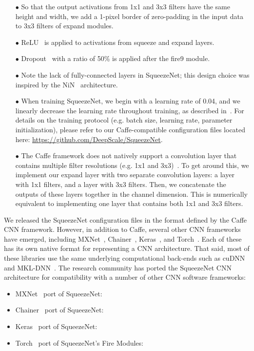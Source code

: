 \documentclass{article} \usepackage{iclr2017_conference,times}
\renewcommand{\cite}{\citep}
\begin{document}
\begin{itemize}
	\setlength\itemsep{0in} \item[$\bullet$]{So that the output activations from 1x1 and 3x3 filters have the same height and width, we add a 1-pixel border of zero-padding in the input data to 3x3 filters of expand modules.}
	\item[$\bullet$]{ReLU~\cite{ReLU} is applied to activations from squeeze and expand layers.}
	\item[$\bullet$]{Dropout~\cite{dropout} with a ratio of 50\% is applied after the fire9 module.}
	\item[$\bullet$]{Note the lack of fully-connected layers in SqueezeNet; this design choice was inspired by the NiN~\cite{NiN} architecture.}
\item[$\bullet$]{When training SqueezeNet, we begin with a learning rate of 0.04, and we linearly decrease the learning rate throughout training, as described in~\cite{linearLR}.
		For details on the training protocol (e.g. batch size, learning rate, parameter initialization), please refer to our Caffe-compatible configuration files located here: \href{https://github.com/DeepScale/SqueezeNet}{https://github.com/DeepScale/SqueezeNet}.}
	\item[$\bullet$]{The Caffe framework does not natively support a convolution layer that contains multiple filter resolutions (e.g. 1x1 and 3x3)~\cite{jia2014caffe}. To get around this, we implement our expand layer with two separate convolution layers: a layer with 1x1 filters, and a layer with 3x3 filters. Then, we concatenate the outputs of these layers together in the channel dimension. This is numerically equivalent to implementing one layer that contains both 1x1 and 3x3 filters.}
\end{itemize}

We released the SqueezeNet configuration files in the format defined by the Caffe CNN framework. 
However, in addition to Caffe, several other CNN frameworks have emerged, including MXNet~\cite{mxnet}, Chainer~\cite{chainer}, Keras~\cite{keras}, and Torch~\cite{torch}.
Each of these has its own native format for representing a CNN architecture.
That said, most of these libraries use the same underlying computational back-ends such as cuDNN~\cite{cuDNN} and MKL-DNN~\cite{IntelDistributedCNN}.
The research community has ported the SqueezeNet CNN architecture for compatibility with a number of other CNN software frameworks:
\begin{itemize}
	\item MXNet~\cite{mxnet} port of SqueezeNet:~\cite{mxnet-squeezenet}
	
	\item Chainer~\cite{chainer} port of SqueezeNet:~\cite{chainer-squeezenet}
	
	\item Keras~\cite{keras} port of SqueezeNet:~\cite{keras-squeezenet}
	
	\item Torch~\cite{torch} port of SqueezeNet's Fire Modules:~\cite{torch-squeezenet}


\end{itemize}
\end{document}
